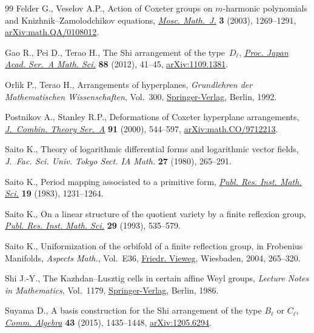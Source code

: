 \documentclass[10pt,a4paper]{amsart}
\numberwithin{equation}{section}
\begin{document}
\begin{thebibliography}{99}
Felder G., Veselov A.P., Action of {C}oxeter groups on {$m$}-harmonic
 polynomials and {K}nizhnik--{Z}amolodchikov equations, \href{https://doi.org/10.17323/1609-4514-2003-3-4-1269-1291}{\textit{Mosc.
 Math.~J.}} \textbf{3} (2003), 1269--1291, \href{https://arxiv.org/abs/math.QA/0108012}{arXiv:math.QA/0108012}.

Gao R., Pei D., Terao H., The {S}hi arrangement of the type~{$D_\ell$},
 \href{https://doi.org/10.3792/pjaa.88.41}{\textit{Proc. Japan Acad. Ser.~A Math. Sci.}} \textbf{88} (2012), 41--45,
 \href{https://arxiv.org/abs/1109.1381}{arXiv:1109.1381}.

Orlik P., Terao H., Arrangements of hyperplanes, \textit{Grundlehren der
 Mathematischen Wissenschaften}, Vol.~300, \href{https://doi.org/10.1007/978-3-662-02772-1}{Springer-Verlag}, Berlin, 1992.

Postnikov A., Stanley R.P., Deformations of {C}oxeter hyperplane arrangements,
 \href{https://doi.org/10.1006/jcta.2000.3106}{\textit{J.~Combin. Theory Ser.~A}} \textbf{91} (2000), 544--597,
 \href{https://arxiv.org/abs/math.CO/9712213}{arXiv:math.CO/9712213}.

Saito K., Theory of logarithmic differential forms and logarithmic vector
 fields, \textit{J.~Fac. Sci. Univ. Tokyo Sect. IA Math.} \textbf{27} (1980),
 265--291.

Saito K., Period mapping associated to a primitive form, \href{https://doi.org/10.2977/prims/1195182028}{\textit{Publ. Res.
 Inst. Math. Sci.}} \textbf{19} (1983), 1231--1264.

Saito K., On a linear structure of the quotient variety by a finite reflexion
 group, \href{https://doi.org/10.2977/prims/1195166742}{\textit{Publ. Res. Inst. Math. Sci.}} \textbf{29} (1993), 535--579.

Saito K., Uniformization of the orbifold of a finite reflection group, in
 Frobenius Manifolds, \textit{Aspects Math.}, Vol.~E36, \href{https://doi.org/10.1007/978-3-322-80236-1_11}{Friedr. Vieweg},
 Wiesbaden, 2004, 265--320.

Shi J.-Y., The {K}azhdan--{L}usztig cells in certain affine {W}eyl groups,
 \textit{Lecture Notes in Mathematics}, Vol.~1179, \href{https://doi.org/10.1007/BFb0074968}{Springer-Verlag}, Berlin,
 1986.

Suyama D., A basis construction for the {S}hi arrangement of the type
 {$B_\ell$} or {$C_\ell$}, \href{https://doi.org/10.1080/00927872.2013.865051}{\textit{Comm. Algebra}} \textbf{43} (2015),
 1435--1448, \href{https://arxiv.org/abs/1205.6294}{arXiv:1205.6294}.


\end{thebibliography}
\end{document}
